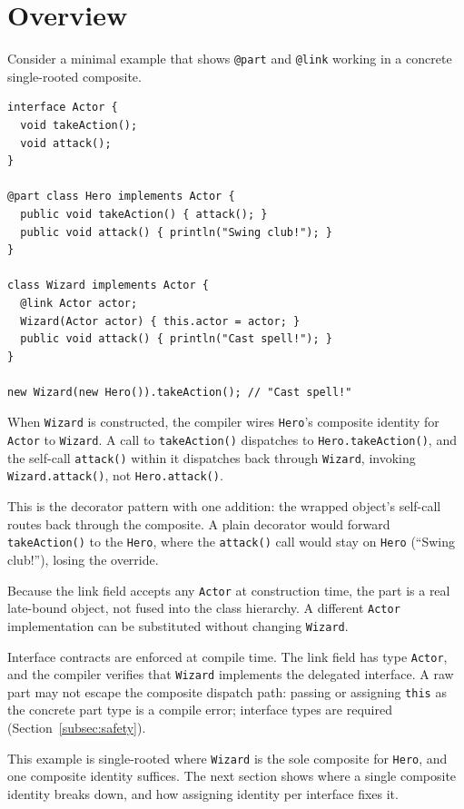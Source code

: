 \documentclass[acmsmall,nonacm]{acmart}
\theoremstyle{acmplain}
\newcommand{\code}[1]{\texttt{#1}}
\begin{document}
\section{Overview}

Consider a minimal example that shows \code{@part} and \code{@link} working in a concrete single-rooted composite.

\begin{lstlisting}
interface Actor {
  void takeAction();
  void attack();
}

@part class Hero implements Actor {
  public void takeAction() { attack(); }
  public void attack() { println("Swing club!"); }
}

class Wizard implements Actor {
  @link Actor actor;
  Wizard(Actor actor) { this.actor = actor; }
  public void attack() { println("Cast spell!"); }
}

new Wizard(new Hero()).takeAction(); // "Cast spell!"
\end{lstlisting}

When \code{Wizard} is constructed, the compiler wires \code{Hero}'s
composite identity for \code{Actor} to \code{Wizard}. A call to
\code{takeAction()} dispatches to \code{Hero.takeAction()}, and the self-call
\code{attack()} within it dispatches back through \code{Wizard}, invoking
\code{Wizard.attack()}, not \code{Hero.attack()}.

This is the decorator pattern with one addition: the wrapped object's self-call
routes back through the composite. A plain decorator would forward
\code{takeAction()} to the \code{Hero}, where the \code{attack()} call would stay on
\code{Hero} (``Swing club!''), losing the override.

Because the link field accepts any \code{Actor} at construction
time, the part is a real late-bound object, not fused into the class
hierarchy. A different \code{Actor} implementation can be substituted
without changing \code{Wizard}.

Interface contracts are enforced at compile time. The link field has
type \code{Actor}, and the compiler verifies that \code{Wizard}
implements the delegated interface. A raw part may not escape the
composite dispatch path: passing or assigning \code{this} as the concrete
part type is a compile error; interface types are required (Section~\ref{subsec:safety}).

This example is single-rooted where \code{Wizard} is the sole composite for \code{Hero}, and one composite identity suffices.
The next section shows where a single composite identity breaks down, and how assigning identity per interface fixes it.
\end{document}
